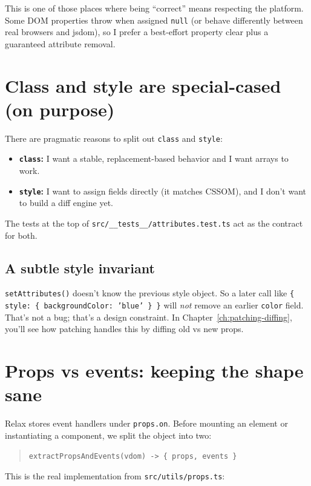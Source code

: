 This is one of those places where being ``correct'' means respecting the platform.
Some DOM properties throw when assigned \texttt{null} (or behave differently between real browsers and jsdom), so I prefer a best-effort property clear plus a guaranteed attribute removal.

\section{Class and style are special-cased (on purpose)}

There are pragmatic reasons to split out \texttt{class} and \texttt{style}:

\begin{itemize}
  \item \textbf{\texttt{class}:} I want a stable, replacement-based behavior and I want arrays to work.
  \item \textbf{\texttt{style}:} I want to assign fields directly (it matches CSSOM), and I don't want to build a diff engine yet.
\end{itemize}

The tests at the top of \texttt{src/\_\_tests\_\_/attributes.test.ts} act as the contract for both.

\subsection*{A subtle style invariant}
	\texttt{setAttributes()} doesn't know the previous style object.
So a later call like \texttt{\{ style: \{ backgroundColor: 'blue' \} \}} will \emph{not} remove an earlier \texttt{color} field.
That's not a bug; that's a design constraint.
In Chapter~\ref{ch:patching-diffing}, you'll see how patching handles this by diffing old vs new props.

\section{Props vs events: keeping the shape sane}\label{sec:props-vs-events}

Relax stores event handlers under \texttt{props.on}.
Before mounting an element or instantiating a component, we split the object into two:

\begin{quote}
	\texttt{extractPropsAndEvents(vdom) -> \{ props, events \}}
\end{quote}

This is the real implementation from \texttt{src/utils/props.ts}:


